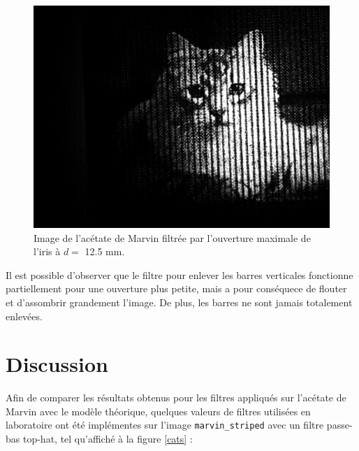 \documentclass[11pt,letterpaper]{article}
\begin{document}
\begin{figure}[H]
  \centering
  \includegraphics[scale=0.28]{marvin_max_d12-5.png}
  \caption{Image de l'acétate de Marvin filtrée par l'ouverture maximale de l'iris à $d =$ 12.5 mm.}
  \label{marvin_max}
\end{figure}

Il est possible d'observer que le filtre pour enlever les barres verticales fonctionne partiellement pour
une ouverture plus petite, mais a pour conséquece de flouter et d'assombrir grandement l'image. De plus, les 
barres ne sont jamais totalement enlevées.

\section{Discussion}

Afin de comparer les résultats obtenus pour les filtres appliqués sur l'acétate de Marvin avec le modèle théorique,
quelques valeurs de filtres utilisées en laboratoire ont été implémentes sur l'image \texttt{marvin\_striped} avec
un filtre passe-bas top-hat, tel qu'affiché à la figure \ref{cats} :
\end{document}
